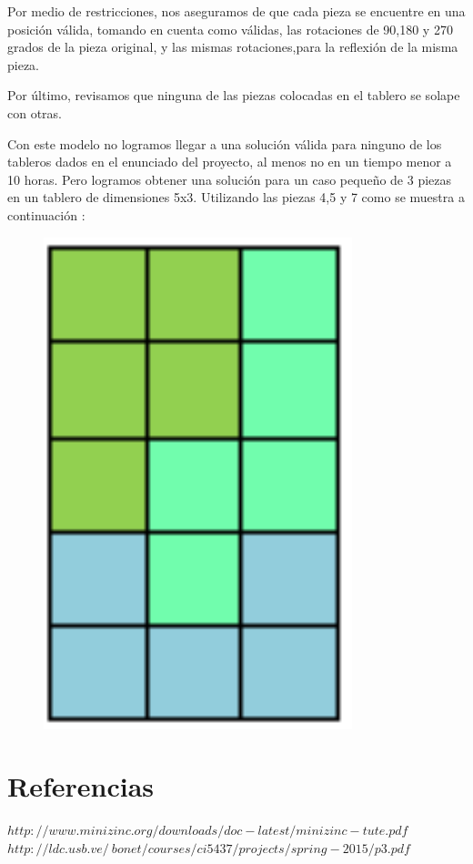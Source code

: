 \documentclass{article}
\begin{document}
Por medio de restricciones, nos aseguramos de que cada pieza se encuentre en una posición válida, tomando en cuenta como válidas, las rotaciones de 90,180 y 270 grados de la pieza original, y las mismas rotaciones,para la reflexión de la misma pieza. \par


Por último, revisamos que ninguna de las piezas colocadas en el tablero se solape con otras. \par

Con este modelo no logramos llegar a una solución válida para ninguno de los tableros dados en el enunciado del proyecto, al menos no en un tiempo menor a 10 horas. Pero logramos obtener una solución para un caso pequeño de 3 piezas en un tablero de dimensiones 5x3. Utilizando las piezas 4,5 y 7 como se muestra a continuación : \par

\begin{figure}[!ht]
\begin{center}
\includegraphics[width=0.8\textwidth]{salida5.png}
\end{center}
\end{figure}



\clearpage

\section{Referencias}


$http://www.minizinc.org/downloads/doc-latest/minizinc-tute.pdf$
$http://ldc.usb.ve/~bonet/courses/ci5437/projects/spring-2015/p3.pdf$
\end{document}
